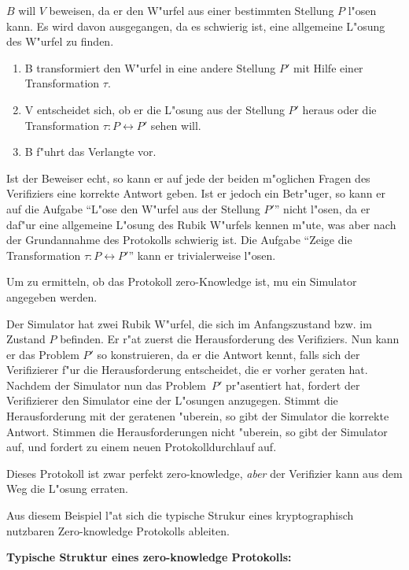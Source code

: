 \begin{beispiel}
$B$ will $V$ beweisen, da\3 er den W"urfel aus einer bestimmten
Stellung $P$ l"osen kann. Es wird davon ausgegangen, da\3 es 
schwierig ist, eine allgemeine L"osung des W"urfel zu finden.
\begin{enumerate}
  \item B transformiert den W"urfel in eine andere Stellung $P'$ mit 
        Hilfe einer Transformation $\tau$.
  \item V entscheidet sich, ob er die L"osung aus der Stellung $P'$ 
        heraus oder die Transformation $\tau : P \leftrightarrow P'$ 
        sehen will.
  \item B f"uhrt das Verlangte vor.
\end{enumerate}
Ist der Beweiser echt, so kann er auf jede der beiden m"oglichen
Fragen des Verifiziers eine korrekte Antwort geben. Ist er jedoch ein
Betr"uger, so kann er auf die Aufgabe "`L"ose den W"urfel aus der
Stellung $P'$"' nicht l"osen, da er daf"ur eine allgemeine L"osung des
Rubik W"urfels kennen m"u\3te, was aber nach der Grundannahme des
Protokolls schwierig ist. Die Aufgabe "`Zeige die Transformation 
$\tau : P \leftrightarrow P'$"' kann er trivialerweise l"osen.

Um zu ermitteln, ob das Protokoll zero-Knowledge ist, mu\3 ein
Simulator angegeben werden. 

Der Simulator hat zwei Rubik W"urfel, die sich im Anfangszustand bzw. im 
Zustand $P$ befinden. Er r"at zuerst die Herausforderung des
Verifiziers. Nun kann er das Problem $P'$ so konstruieren, da\3 er die
Antwort kennt, falls sich der Verifizierer f"ur die Herausforderung
entscheidet, die er vorher geraten hat. Nachdem der Simulator nun das
Problem~$P'$ pr"asentiert hat, fordert der Verifizierer den Simulator
eine der L"osungen anzugegen. Stimmt die Herausforderung mit der
geratenen "uberein, so gibt der Simulator die korrekte
Antwort. Stimmen die Herausforderungen nicht "uberein, so gibt der
Simulator auf, und fordert zu einem neuen Protokolldurchlauf auf.

Dieses Protokoll ist zwar perfekt zero-knowledge, {\em aber} der 
Verifizier kann aus dem Weg die L"osung erraten.
\end{beispiel}

Aus diesem Beispiel l"a\3t sich die typische Strukur eines
kryptographisch nutzbaren Zero-knowledge Protokolls ableiten.

{\bf Typische Struktur eines zero-knowledge Protokolls:}

